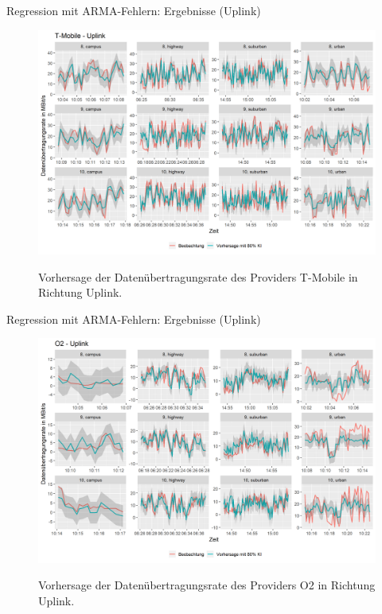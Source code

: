 \begin{frame}{Regression mit ARMA-Fehlern: Ergebnisse (Uplink)}
	\begin{figure}
		\centering
		\includegraphics[scale=0.38]{plots/arima/uplink/tmobile_predictions}\\
		\caption{Vorhersage der Datenübertragungsrate des Providers T-Mobile in Richtung Uplink.}
		\label{tmobile_predictions_ul}
	\end{figure}
\end{frame}

\begin{frame}{Regression mit ARMA-Fehlern: Ergebnisse (Uplink)}
	\begin{figure}
		\centering
		\includegraphics[scale=0.38]{plots/arima/uplink/o2_predictions}\\
		\caption{Vorhersage der Datenübertragungsrate des Providers O2 in Richtung Uplink.}
		\label{o2_predictions_ul}
	\end{figure}
\end{frame}

